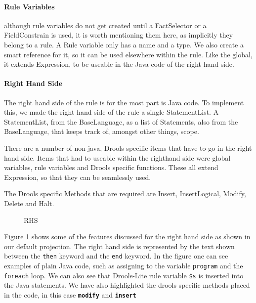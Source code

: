 \paragraph{Rule Variables} although rule variables do not get created until a FactSelector or a FieldConstrain is used, it is worth mentioning them here, as implicitly they belong to a rule.
A Rule variable only has a name and a type.
We also create a smart reference for it, so it can be used elsewhere within the rule.
Like the global, it extends Expression, to be useable in the Java code of the right hand side.

\paragraph{Right Hand Side}
The right hand side of the rule is for the most part is Java code.
To implement this, we made the right hand side of the rule a single StatementList.
A StatementList, from the BaseLanguage, as a list of Statements, also from the BaseLanguage, that keeps track of, amongst other things, scope.

There are a number of non-java, Drools specific items that have to go in the right hand side.
Items that had to useable within the righthand side were global variables, rule variables and Drools specific functions.
These all extend Expression, so that they can be seamlessly used.

The Drools specific Methods that are required are Insert, InsertLogical, Modify, Delete and Halt.

\begin{figure}[!h]
    \centering
    \caption{RHS}
    \label{fig:RHS}
\end{figure}

Figure \ref{fig:RHS} shows some of the features discussed for the right hand side as shown in our default projection.
The right hand side is represented by the text shown between the \texttt{then} keyword and the \texttt{end} keyword.
In the figure one can see examples of plain Java code, such as assigning to the variable \texttt{program} and the \texttt{foreach} loop.
We can also see that Drools-Lite rule variable \texttt{\$s} is inserted into the Java statements.
We have also highlighted the drools specific methods placed in the code, in this case \texttt{\textbf{modify}} and \texttt{\textbf{insert}}   

